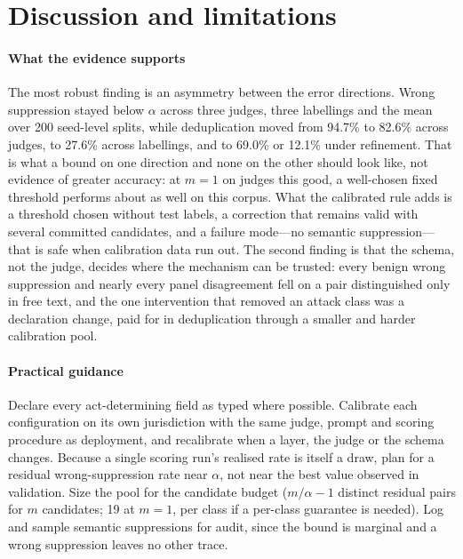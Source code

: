 \section{Discussion and limitations}\label{sec:discussion}

\paragraph{What the evidence supports}
The most robust finding is an asymmetry between the error directions. Wrong suppression stayed below $\alpha$ across three judges, three labellings and the mean over 200 seed-level splits, while deduplication moved from 94.7\% to 82.6\% across judges, to 27.6\% across labellings, and to 69.0\% or 12.1\% under refinement. That is what a bound on one direction and none on the other should look like, not evidence of greater accuracy: at $m=1$ on judges this good, a well-chosen fixed threshold performs about as well on this corpus. What the calibrated rule adds is a threshold chosen without test labels, a correction that remains valid with several committed candidates, and a failure mode---no semantic suppression---that is safe when calibration data run out. The second finding is that the schema, not the judge, decides where the mechanism can be trusted: every benign wrong suppression and nearly every panel disagreement fell on a pair distinguished only in free text, and the one intervention that removed an attack class was a declaration change, paid for in deduplication through a smaller and harder calibration pool.

\paragraph{Practical guidance}
Declare every act-determining field as typed where possible. Calibrate each configuration on its own jurisdiction with the same judge, prompt and scoring procedure as deployment, and recalibrate when a layer, the judge or the schema changes. Because a single scoring run's realised rate is itself a draw, plan for a residual wrong-suppression rate near $\alpha$, not near the best value observed in validation. Size the pool for the candidate budget ($m/\alpha-1$ distinct residual pairs for $m$ candidates; 19 at $m=1$, per class if a per-class guarantee is needed). Log and sample semantic suppressions for audit, since the bound is marginal and a wrong suppression leaves no other trace.

